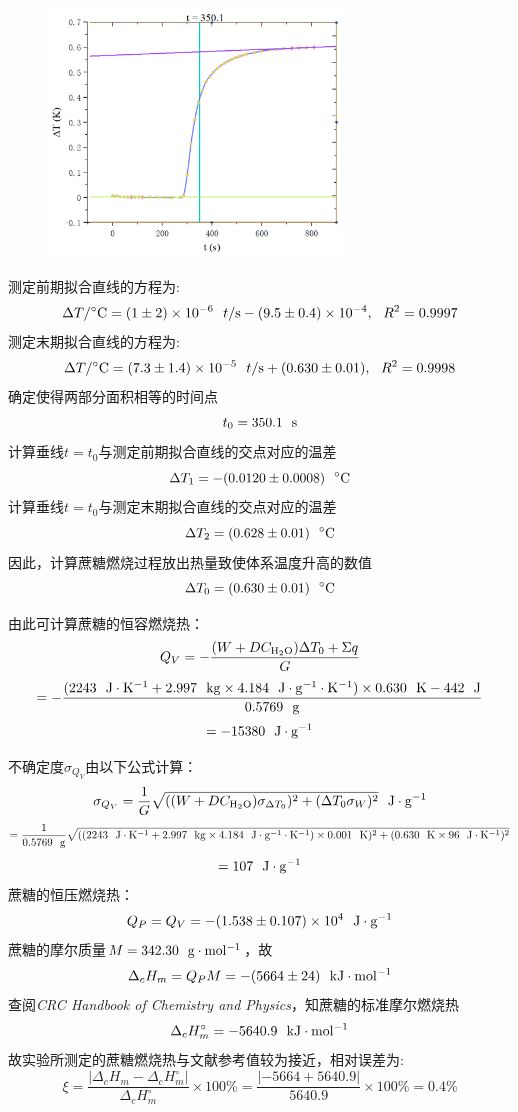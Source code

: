 \documentclass[12pt]{article}
\begin{document}
		\begin{figure}[!h]
			\centering
			\includegraphics[width=0.7\textwidth]{5.png}
		\end{figure}
		\par
		测定前期拟合直线的方程为:
		$$
		\Delta T/{\rm ^{\circ}C} =(1\pm 2)\times 10^{-6} \ \ t/{\rm s}-(9.5\pm 0.4)\times 10^{-4},\  \ R^{2}=0.9997
		$$
		测定末期拟合直线的方程为:
		$$
		\Delta T/{\rm ^{\circ}C} =(7.3\pm 1.4)\times 10^{-5} \ \ t/{\rm s}+(0.630\pm 0.01),\  \ R^{2}=0.9998
		$$
		确定使得两部分面积相等的时间点
		$$
		t_{0}=350.1\ \ {\rm s}
		$$
		计算垂线$t=t_{0}$与测定前期拟合直线的交点对应的温差
		$$
		\Delta T_{1}=-(0.0120\pm 0.0008)\ \ {\rm ^{\circ}C}
		$$
		计算垂线$t=t_{0}$与测定末期拟合直线的交点对应的温差
		$$
		\Delta T_{2}=(0.628\pm 0.01)\ \ {\rm ^{\circ}C}
		$$
		因此，计算蔗糖燃烧过程放出热量致使体系温度升高的数值
		$$
		\Delta T_{0}=(0.630\pm 0.01)\ \ {\rm ^{\circ}C}
		$$
		\par
		由此可计算蔗糖的恒容燃烧热：
		$$
		Q_{V}=-\frac{(W+DC_{\rm H_{2}O})\Delta T_{0}+\Sigma q}{G}
		$$
		$$
		=-\frac{(2243\ \ {\rm J\cdot K^{-1}}+2.997\ \ {\rm kg}\times 4.184\ \ {\rm J\cdot g^{-1}\cdot K^{-1}})\times 0.630\ \ {\rm K}-442\ \ {\rm J}}{0.5769\ \ {\rm g}}
		$$
		$$
		=-15380\ \ {\rm J\cdot g^{-1}}
		$$
		\par
		不确定度$\sigma_{Q_{V}}$由以下公式计算：
		$$
		\sigma_{Q_{V}}=\frac{1}{G}\sqrt{((W+DC_{\rm H_{2}O})\sigma_{\Delta T_{0}})^{2}+(\Delta T_{0}\sigma_{W})^{2}} \ \ {\rm J\cdot g^{-1}}
		$$
		$$
		=\frac{1}{0.5769\ \ {\rm g}}\sqrt{((2243\ \ {\rm J\cdot K^{-1}}+2.997\ \ {\rm kg}\times 4.184\ \ {\rm J\cdot g^{-1}\cdot K^{-1}})\times 0.001\ \ {\rm K})^{2}+(0.630\ \ {\rm K}\times 96\ \ {\rm J\cdot K^{-1}})^{2}}
		$$
		$$
		=107\ \ {\rm J\cdot g^{-1}}
		$$
		蔗糖的恒压燃烧热：
		$$
		Q_{P}=Q_{V}=-(1.538\pm 0.107)\times 10^{4}\ \ {\rm J\cdot g^{-1}}
		$$
		蔗糖的摩尔质量$M=342.30\ \ {\rm g\cdot mol^{-1}}$，故
		$$
		\Delta_{c}H_{m}=Q_{P}M=-(5664\pm 24)\ \ {\rm kJ\cdot mol^{-1}}
		$$
		查阅\textit{CRC Handbook of Chemistry and Physics}\citealp{crc}，知蔗糖的标准摩尔燃烧热
		$$
		\Delta_{c}H^{\circ}_{m}=-5640.9\ \ {\rm kJ\cdot mol^{-1}}
		$$
		故实验所测定的蔗糖燃烧热与文献参考值较为接近，相对误差为:
		$$
		\xi=\frac{|\Delta_{c}H_{m}-\Delta_{c}H^{\circ}_{m}|}{\Delta_{c}H^{\circ}_{m}}\times 100\%=\frac{|-5664+5640.9|}{5640.9}\times 100\%=0.4\%
		$$
\end{document}
